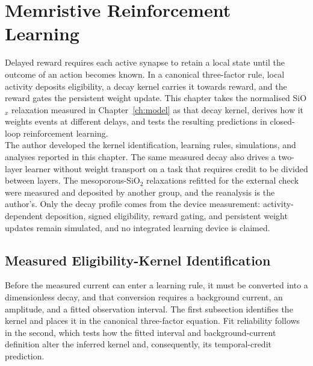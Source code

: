 
\chapter{Memristive Reinforcement Learning}\label{ch:learning}

\noindent Delayed reward requires each active synapse to retain a local state until the outcome of an action becomes
known. In a canonical three-factor rule, local activity deposits eligibility, a decay kernel carries it towards reward,
and the reward gates the persistent weight update. This chapter takes the normalised SiO$_x$ relaxation
measured in Chapter~\ref{ch:model} as that decay kernel, derives how it weights events at different delays, and tests
the resulting predictions in closed-loop reinforcement learning.\\

\noindent The author developed the kernel identification, learning rules, simulations, and analyses reported in this
chapter. The same measured decay also drives a two-layer learner without weight transport on a task that requires
credit to be divided between layers. The mesoporous-SiO$_2$ relaxations \cite{zhang2024mesoporous} refitted for the
external check were measured and deposited by another group, and the reanalysis is the author's. Only the decay
profile comes from the device measurement: activity-dependent
deposition, signed eligibility, reward gating, and persistent weight updates remain simulated, and no integrated
learning device is claimed.

\section[Measured Eligibility-Kernel Identification]{Measured Eligibility-Kernel Identification}
\label{sec:7p1}

\noindent Before the measured current can enter a learning rule, it must be converted into a dimensionless decay, and
that conversion requires a background current, an amplitude, and a fitted observation interval. The first subsection
identifies the kernel and places it in the canonical three-factor equation. Fit reliability follows in the second, which
tests how the fitted interval and background-current definition alter the inferred kernel and, consequently, its
temporal-credit prediction.

